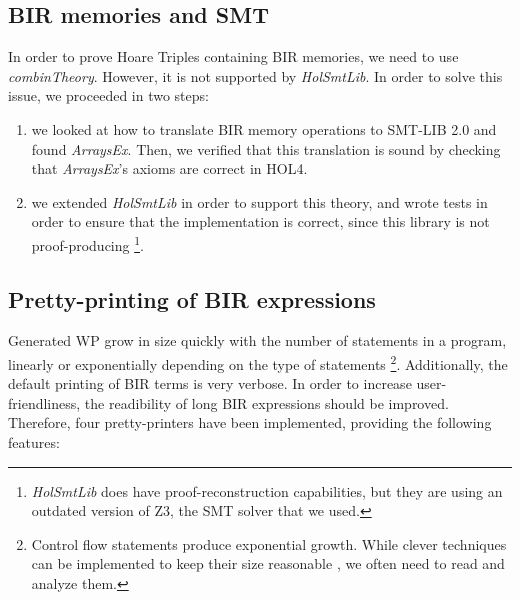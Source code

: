 \documentclass[10pt,a4paper]{article}
\begin{document}
\begin{multicols}{2}
\subsection{BIR memories and SMT} \label{bir-memories-with-smt-solvers}


In order to prove Hoare Triples containing BIR memories, we need to use \textit{combinTheory}. However, it is not supported by \textit{HolSmtLib}. In order to solve this issue, we proceeded in two steps:

\begin{enumerate}
  \item we looked at how to translate BIR memory operations to SMT-LIB 2.0 and found \textit{ArraysEx}. Then, we verified that this translation is sound by checking that \textit{ArraysEx}'s axioms are correct in HOL4.
  \item we extended \textit{HolSmtLib} in order to support this theory, and wrote tests in order to ensure that the implementation is correct, since this library is not proof-producing \footnote{\textit{HolSmtLib} does have proof-reconstruction capabilities, but they are using an outdated version of Z3, the SMT solver that we used.}.
\end{enumerate}

\subsection{Pretty-printing of BIR expressions} \label{pretty-printers}

Generated WP grow in size quickly with the number of statements in a program, linearly or exponentially depending on the type of statements \footnote{Control flow statements produce exponential growth. While clever techniques can be implemented to keep their size reasonable \cite{lindner_trabin:_2019}, we often need to read and analyze them.}. Additionally, the default printing of BIR terms is very verbose. In order to increase user-friendliness, the readibility of long BIR expressions should be improved. Therefore, four pretty-printers have been implemented, providing the following features:


\end{multicols}
\end{document}
